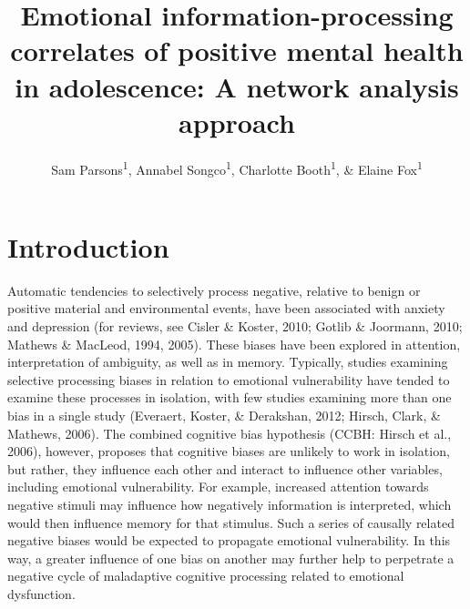 \documentclass[
  english,
  man,floatsintext]{apa6}
\author{Sam Parsons\textsuperscript{1}, Annabel Songco\textsuperscript{1}, Charlotte Booth\textsuperscript{1}, \& Elaine Fox\textsuperscript{1}}
\affiliation{
\vspace{0.5cm}
\textsuperscript{1} Department of Experimental Psychology, University of Oxford}
\title{Emotional information-processing correlates of positive mental health in adolescence: A network analysis approach}
\date{}
\begin{document}
\maketitle

\hypertarget{introduction}{%
\section{Introduction}\label{introduction}}

Automatic tendencies to selectively process negative, relative to benign or positive material and environmental events, have been associated with anxiety and depression (for reviews, see Cisler \& Koster, 2010; Gotlib \& Joormann, 2010; Mathews \& MacLeod, 1994, 2005). These biases have been explored in attention, interpretation of ambiguity, as well as in memory. Typically, studies examining selective processing biases in relation to emotional vulnerability have tended to examine these processes in isolation, with few studies examining more than one bias in a single study (Everaert, Koster, \& Derakshan, 2012; Hirsch, Clark, \& Mathews, 2006). The combined cognitive bias hypothesis (CCBH: Hirsch et al., 2006), however, proposes that cognitive biases are unlikely to work in isolation, but rather, they influence each other and interact to influence other variables, including emotional vulnerability. For example, increased attention towards negative stimuli may influence how negatively information is interpreted, which would then influence memory for that stimulus. Such a series of causally related negative biases would be expected to propagate emotional vulnerability. In this way, a greater influence of one bias on another may further help to perpetrate a negative cycle of maladaptive cognitive processing related to emotional dysfunction.
\end{document}
